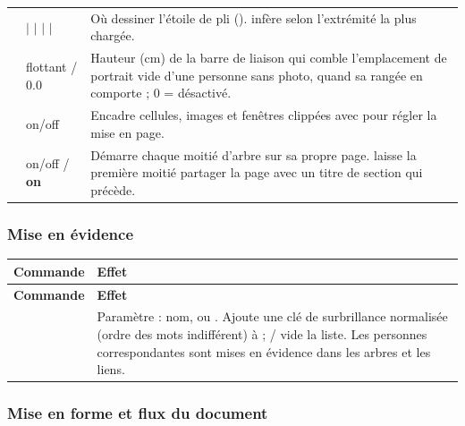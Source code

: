 \begin{longtable}{C T F}
      &  $|$  $|$  $|$ 
$|$  & Où dessiner l'étoile de pli ().
 infère selon l'extrémité la plus chargée. \\

\addlinespace
{}  & flottant / 0.0 & Hauteur (cm) de la barre de liaison qui
comble l'emplacement de portrait vide d'une personne sans photo, quand sa
rangée en comporte ; 0 = désactivé. \\
\addlinespace

     & on/off & Encadre cellules, images et fenêtres clippées
avec  pour régler la mise en page. \\
\addlinespace

   & on/off / \textbf{on} & Démarre chaque moitié d'arbre sur
sa propre page.  laisse la première moitié partager la page avec un
titre de section qui précède. \\
\end{longtable}

\subsubsection*{Mise en évidence}

\begin{longtable}{C E}
\toprule
\textbf{Commande} & \textbf{Effet} \\
\midrule
\endfirsthead
\toprule
\textbf{Commande} & \textbf{Effet} \\
\midrule
\endhead
\bottomrule
\endfoot
{} & Paramètre : nom, ou . Ajoute une clé de surbrillance
normalisée (ordre des mots indifférent) à  ; /
vide la liste. Les personnes correspondantes sont mises en évidence dans les
arbres et les liens. \\
\end{longtable}

\subsubsection*{Mise en forme et flux du document}

